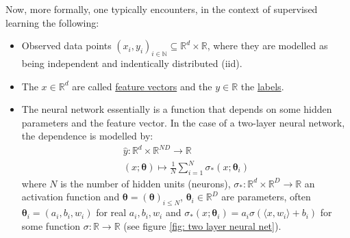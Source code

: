 \documentclass{article}
\theoremstyle{mystyle}
\newcommand{\N}{\ensuremath{\mathbb{N}}}
\newcommand{\R}{\ensuremath{\mathbb{R}}}
\newcommand{\bracket}[2]{\langle #1, #2\rangle}
\begin{document}
Now, more formally, one typically encounters, in the context of supervised learning the following: 
\begin{itemize}
	\item Observed data points $ (x_{i},y_{i})_{i\in \N}\subseteq \R^{d}\times \R$, where they are modelled as being independent and indentically distributed (iid).
	\item The $ x\in \R^{d}$ are called \underline{feature vectors} and the $ y\in \R$ the \underline{labels}.
	\item The neural network essentially is a function that depends on some hidden parameters and the feature vector. In the case of a two-layer neural network, the dependence is modelled by: 
		\begin{equation}\label{eq: neural net def}
			\begin{array}{cc}
			\hat{y}:\R^{d}\times \R^{ND}\to \R   \\
			(x;\mathbf{\theta})\mapsto \frac{1}{N}\displaystyle\sum^{N}_{i=1}\sigma_{*}(x;\mathbf{\theta}_{i})     
	     \end{array}
     \end{equation}
		where $ N$ is the number of hidden units (neurons), $ \sigma_{*}:\R^{d}\times\R^{D}\to \R$ an activation function and $\mathbf{\theta} = (\mathbf{\theta})_{i\leq N}$, $\mathbf{\theta}_{i}\in \R^{D}$ are parameters, often $\mathbf{\theta}_{i} = (a_{i}, b_{i}, w_{i})$ for real $ a_{i}, b_{i}, w_{i}$ and $ \sigma_{*}(x;\mathbf{\theta}_{i})=a_{i}\sigma(\bracket{x}{w_{i}}+b_{i})$ for some function $ \sigma:\R\to \R$ (see figure \ref{fig: two layer neural net}).
\end{itemize}
\end{document}
